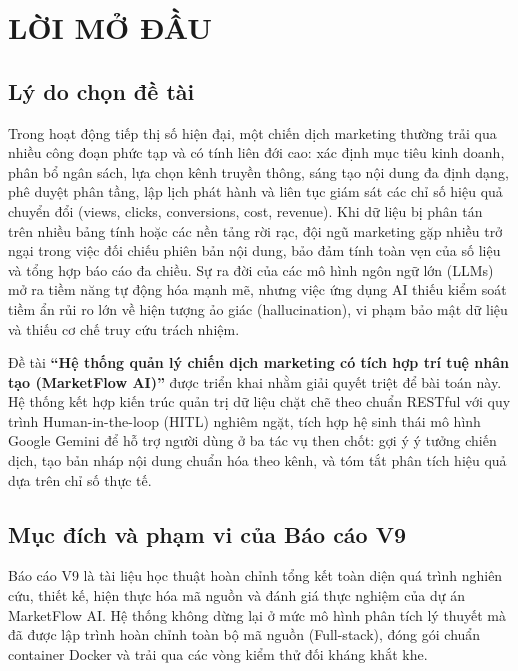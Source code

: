 \chapter*{LỜI MỞ ĐẦU}

\section*{Lý do chọn đề tài}

Trong hoạt động tiếp thị số hiện đại, một chiến dịch marketing thường trải qua nhiều công đoạn phức tạp và có tính liên đới cao: xác định mục tiêu kinh doanh, phân bổ ngân sách, lựa chọn kênh truyền thông, sáng tạo nội dung đa định dạng, phê duyệt phân tầng, lập lịch phát hành và liên tục giám sát các chỉ số hiệu quả chuyển đổi (views, clicks, conversions, cost, revenue). Khi dữ liệu bị phân tán trên nhiều bảng tính hoặc các nền tảng rời rạc, đội ngũ marketing gặp nhiều trở ngại trong việc đối chiếu phiên bản nội dung, bảo đảm tính toàn vẹn của số liệu và tổng hợp báo cáo đa chiều. Sự ra đời của các mô hình ngôn ngữ lớn (LLMs) mở ra tiềm năng tự động hóa mạnh mẽ, nhưng việc ứng dụng AI thiếu kiểm soát tiềm ẩn rủi ro lớn về hiện tượng ảo giác (hallucination), vi phạm bảo mật dữ liệu và thiếu cơ chế truy cứu trách nhiệm.

Đề tài \textbf{“Hệ thống quản lý chiến dịch marketing có tích hợp trí tuệ nhân tạo (MarketFlow AI)”} được triển khai nhằm giải quyết triệt để bài toán này. Hệ thống kết hợp kiến trúc quản trị dữ liệu chặt chẽ theo chuẩn RESTful với quy trình Human-in-the-loop (HITL) nghiêm ngặt, tích hợp hệ sinh thái mô hình Google Gemini để hỗ trợ người dùng ở ba tác vụ then chốt: gợi ý ý tưởng chiến dịch, tạo bản nháp nội dung chuẩn hóa theo kênh, và tóm tắt phân tích hiệu quả dựa trên chỉ số thực tế.

\section*{Mục đích và phạm vi của Báo cáo V9}

Báo cáo V9 là tài liệu học thuật hoàn chỉnh tổng kết toàn diện quá trình nghiên cứu, thiết kế, hiện thực hóa mã nguồn và đánh giá thực nghiệm của dự án MarketFlow AI. Hệ thống không dừng lại ở mức mô hình phân tích lý thuyết mà đã được lập trình hoàn chỉnh toàn bộ mã nguồn (Full-stack), đóng gói chuẩn container Docker và trải qua các vòng kiểm thử đối kháng khắt khe.

